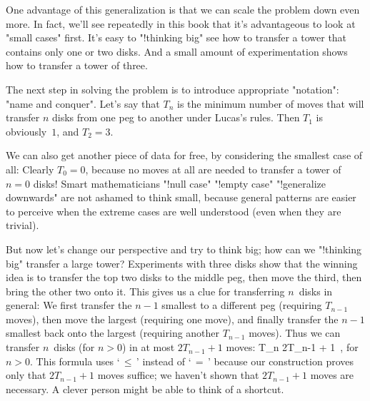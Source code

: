One advantage of this generalization is that we can scale the problem
down even more. In fact, we'll see repeatedly in this book that
it's advantageous to {\sc look at "small cases"} first. It's easy to
"!thinking big"
see how to transfer a tower that contains only one or two disks.
And a small amount of experimentation shows how to transfer a tower of three.

The next step in solving the problem is to introduce appropriate "notation":
{\sc "name and conquer"}. Let's say that $T_n$ is the minimum number
of moves that will transfer $n$ disks from one peg to another under
Lucas's rules. Then $T_1$ is obviously~$1$, and $T_2=3$.

We can also get another piece of data for free, by considering the
smallest case of all: Clearly $T_0=0$, because no moves at all are needed to
transfer a tower of $n=0$ disks! Smart mathematicians
"!null case" "!empty case" "!generalize downwards"
are not ashamed to think small, because general patterns are easier
to perceive when the extreme cases are well understood (even when they are
trivial).

But now let's change our perspective and try to think big; how can we
"!thinking big"
transfer a large tower? Experiments with three disks show that the
winning idea is to transfer the top two disks to the middle peg, then
move the third, then bring the other two onto it. This gives us a
clue for transferring $n$~disks in general: We
first transfer the $n-1$ smallest to a different peg
(requiring $T_{n-1}$ moves),
then move the largest (requiring one move),
and finally transfer the $n-1$ smallest back onto the largest
(requiring another $T_{n-1}$ moves).
Thus we can transfer $n$~disks (for $n>0$) in at most $2T_{n-1}+1$ moves:
\begindisplay
 T_n	\leq 2T_{n-1} + 1 \,, \qquad\hbox{for $n>0$.}
\enddisplay
This formula uses `$\,\leq\,$' instead of `$\,=\,$' because our construction
proves only that $2T_{n-1}+1$ moves suffice; we haven't shown that $2T_{n-1}+1$
moves are necessary. A clever person might be able to think of a shortcut.

